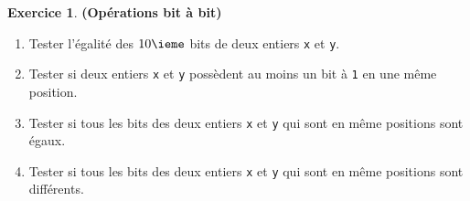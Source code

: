 \documentclass[11pt]{article}
\theoremstyle{definition}
\newtheorem{Exercice}{Exercice}
\begin{document}
\begin{Exercice} {\bf (Opérations bit à bit)}
\begin{enumerate}
    \item Tester l'égalité des $10\ieme$ bits de deux entiers {\tt x} et
    {\tt y}.
    \smallskip


    \item Tester si deux entiers {\tt x} et {\tt y} possèdent au moins
    un bit à {\tt 1} en une même position.
    \smallskip

    \item Tester si tous les bits des deux entiers {\tt x} et {\tt y}
    qui sont en même positions sont égaux.
    \smallskip

    \item Tester si tous les bits des deux entiers {\tt x} et {\tt y}
    qui sont en même positions sont différents.
    \smallskip
\end{enumerate}
\end{Exercice}
\bigskip
\end{document}
